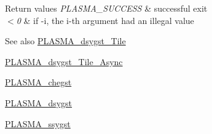 \begin{DoxyRetVals}{Return values}
{\em P\+L\+A\+S\+M\+A\+\_\+\+S\+U\+C\+C\+E\+S\+S} & successful exit \\
\hline
{\em $<$0} & if -\/i, the i-\/th argument had an illegal value\\
\hline
\end{DoxyRetVals}
\begin{DoxySeeAlso}{See also}
\hyperlink{group__double__Tile_ga3500cf0cf6d6b233f3f1078d5f5057d8_ga3500cf0cf6d6b233f3f1078d5f5057d8}{P\+L\+A\+S\+M\+A\+\_\+dsygst\+\_\+\+Tile} 

\hyperlink{group__double__Tile__Async_ga81f098686ef0966de91ce9d450ee22e6_ga81f098686ef0966de91ce9d450ee22e6}{P\+L\+A\+S\+M\+A\+\_\+dsygst\+\_\+\+Tile\+\_\+\+Async} 

\hyperlink{group__PLASMA__Complex32__t_gac4b81a8ac8396c84a27d8a0b719bc379_gac4b81a8ac8396c84a27d8a0b719bc379}{P\+L\+A\+S\+M\+A\+\_\+chegst} 

\hyperlink{group__double_ga7ab44c615960d36295086012efc45a7d_ga7ab44c615960d36295086012efc45a7d}{P\+L\+A\+S\+M\+A\+\_\+dsygst} 

\hyperlink{group__float_ga66b77c0de44f80760c4184756250e75e_ga66b77c0de44f80760c4184756250e75e}{P\+L\+A\+S\+M\+A\+\_\+ssygst} 
\end{DoxySeeAlso}
\hypertarget{group__double_ga7efdf7cffbb28696c69310d1627a100d_ga7efdf7cffbb28696c69310d1627a100d}{}
